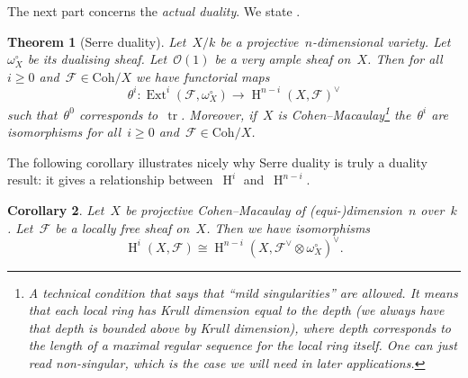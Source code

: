 \documentclass[10pt,a4paper]{article}
\theoremstyle{lecture}
\newtheorem{theorem}{Theorem}
\newtheorem{corollary}[theorem]{Corollary}
\newcommand\dash{\nobreakdash-\hspace{0pt}}
\newcommand\Coh{\ensuremath{\mathrm{Coh}}}
\DeclareMathOperator\Ext{Ext}
\DeclareMathOperator\HH{H}
\DeclareMathOperator\tr{tr}
\begin{document}
The next part concerns the \emph{actual duality}. We state \cite[proposition III.7.6]{hartshorne-algebraic-geometry}.
\begin{theorem}[Serre duality]
  \label{theorem:serre-duality}
  Let~$X/k$ be a projective~$n$\dash dimensional variety. Let~$\omega_X^\circ$ be its dualising sheaf. Let~$\mathcal{O}(1)$ be a very ample sheaf on~$X$. Then for all~$i\geq 0$ and~$\mathcal{F}\in\Coh/X$ we have functorial maps
  \begin{equation}
    \theta^i\colon\Ext^i(\mathcal{F},\omega_X^\circ)\to\HH^{n-i}(X,\mathcal{F})^\vee
  \end{equation}
  such that~$\theta^0$ corresponds to~$\tr$. Moreover, if~$X$ is Cohen--Macaulay\footnote{A technical condition that says that ``mild singularities'' are allowed. It means that each local ring has Krull dimension equal to the depth (we always have that depth is bounded above by Krull dimension), where depth corresponds to the length of a maximal regular sequence for the local ring itself. One can just read non-singular, which is the case we will need in later applications.} the~$\theta^i$ are isomorphisms for all~$i\geq 0$ and~$\mathcal{F}\in\Coh/X$.
\end{theorem}
The following corollary illustrates nicely why Serre duality is truly a duality result: it gives a relationship between~$\HH^i$ and~$\HH^{n-i}$.
\begin{corollary}
  Let~$X$ be projective Cohen--Macaulay of (equi-)dimension~$n$ over~$k$. Let~$\mathcal{F}$ be a locally free sheaf on~$X$. Then we have isomorphisms
  \begin{equation}
    \HH^i(X,\mathcal{F})\cong\HH^{n-i}(X,\mathcal{F}^\vee\otimes\omega_X^\circ)^\vee.
  \end{equation}
\end{corollary}
\end{document}
